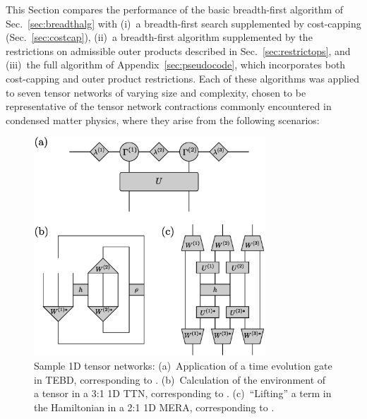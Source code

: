 \documentclass[aps,pre,reprint,superscriptaddress,amsfonts,amsmath,showpacs,nofootinbib,floatfix]{revtex4-1}
\newcommand{\sref}[1]{Sec.~\ref{#1}}
\newcommand{\aref}[1]{Appendix~\ref{#1}}
\newcommand{\pEref}[1]{\protect{Eq.~(\ref{#1})}}
\begin{document}
This Section compares the performance of the basic breadth-first algorithm of \sref{sec:breadthalg} with (i)~a breadth-first search supplemented by cost-capping (\sref{sec:costcap}), (ii)~a breadth-first algorithm supplemented by the restrictions on admissible outer products described in \sref{sec:restrictops}, and (iii)~the full algorithm of \aref{sec:pseudocode}, which incorporates both cost-capping and outer product restrictions. %
Each of these algorithms was applied to seven tensor networks of varying size and complexity, chosen to be representative of the tensor network contractions commonly encountered in condensed matter physics, where they arise from the following scenarios:
\begin{figure}
\includegraphics[width=246.0pt]{1DTNs}
\caption{Sample 1D tensor networks: 
(a)~Application of a time evolution gate in TEBD, corresponding to \pEref{eq:TEBD}. %
(b)~Calculation of the environment of a tensor in a 3:1 1D TTN, corresponding to \pEref{eq:1DTTN}. %
(c)~``Lifting'' a term in the Hamiltonian in a 2:1 1D MERA, corresponding to \pEref{eq:21MERA}. %
\label{fig:1DTNs}}
\end{figure}%
\end{document}

